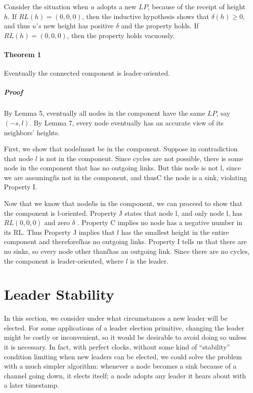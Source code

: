 Consider the situation when $u$ adopts a new $LP$, because of the receipt of height $h$. If $RL(h) = (0, 0, 0)$, then the inductive hypothesis shows that $\delta(h) \geq 0$, and thus $u’s$ new height has positive $\delta$ and the property holds. If $RL(h) = (0, 0, 0)$, then the property holds vacuously.

\paragraph{Theorem 1}Eventually the connected component is leader-oriented.
\subparagraph{Proof}By Lemma 5, eventually all nodes in the component have the same $LP$, say $(-s, l)$. By Lemma 7, every node eventually has an accurate view of its neighbors’ heights. 

First, we show that node$ l $must be in the component. Suppose in contradiction that node $ l $ is not in the component. Since cycles are not possible, there is some node in the component that has no outgoing links. But this node is not l, since we are assuming$ l $is not in the component, and thusC the node is a sink, violating Property I.

Now that we know that node$ l $is in the component, we can proceed to show that the component is l-oriented. Property J states that node l, and only node l, has $RL (0,0,0)$ and zero $\delta$ . Property C implies no node has a negative number in its RL. Thus Property J implies that $ l $ has the smallest height in the entire component and therefore$ l $has no outgoing links. Property I tells us that there are no sinks, so every node other than$ l $has an outgoing link. Since there are no cycles, the component is leader-oriented, where $ l $ is the leader.
\section{Leader Stability}

\paragraph{}In this section, we consider under what circumstances a new leader will be elected. For some applications of a leader election primitive, changing the leader might be costly or inconvenient, so it would be desirable to avoid doing so unless it is necessary. In fact, with perfect clocks, without some kind of “stability” condition limiting when new leaders can be elected, we could solve the problem with a much simpler algorithm: whenever a node becomes a sink because of a channel going down, it elects itself; a node adopts any leader it hears about with a later timestamp.

